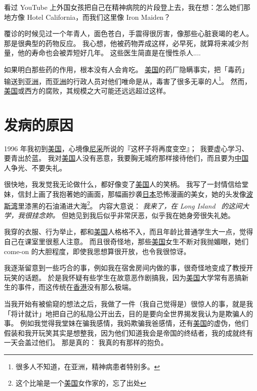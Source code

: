\documentclass[12pt]{report}
\newcommand{\speechCn}[1]{\textrm{\textit{\textcolor{Speech}{#1}}}}
\begin{document}
{看过 YouTube 上外国女孩把自己在精神病院的片段登上去，我在想：怎么她们那地方像 Hotel California，而我们这里像 Iron Maiden？

覆诊的时候见过一个年青人，面色苍白，手震得很厉害，像那些心脏衰竭的老人。 那是很典型的药物反应。 我心想，他被药物弄成这样，必早死，就算将来减少剂量，他的寿命也会被弄短好几年。 这些医生简直是在慢性杀人....

如果明白那些药的作用，根本没有人会肯吃。 \uline{美国}的药厂隐瞒事实，把「毒药」输送到\uline{亚洲}，而\uline{亚洲}的行政人员对他们唯命是从，毒害了很多无辜的人\footnote{很多人不知道，在亚洲，精神病患者特别多。}。 然而，\uline{美国}或西方的腐败，其规模之大可能还远远超过这样。


\chapter{发病的原因}
\label{cause-of-illness}

1996 年我初到\uline{美国}，心境像\uline{尼采}所说的『这杯子将再度变空』；\ 我要虚心学习、要青出於蓝。 我对\uline{美国}人没有恶意，我要胸无城府那样接待他们，而且要为\uline{中国}人争光、不要失礼。

很快地，我发觉我无论做什么，都好像变了\uline{美国}人的笑柄。 我写了一封情信给堂妹，信封上画了我抱著她的画面，那幅画抄袭\uline{日本}恐怖漫画的美女，她的头发像\uline{波斯湾}里漆黑的石油涌进大海\footnote{这个比喻是一个\uline{美国}女作家的，忘了出处}。 内容大意说： \speechCn{我来了，在 Long Island \ 的这间大学，我很挂念妳。}  但她见到我后似乎非常厌恶，似乎我在她身旁很失礼她。

我穿的衣服、行为举止，都和\uline{美国}人格格不入，而且年龄比普通学生大一点，觉得自己在课室里很惹人注意。 而且很奇怪地，那些\uline{美国}女生不断对我抛媚眼，她们 come-on 的大胆程度，即使我思想算很开放，也令我很惊讶。

我逐渐留意到一些巧合的事，例如我在宿舍房间内做的事，很奇怪地变成了教授开玩笑的话题。 於是我怀疑有些学生在故意恶作剧搞我，因为\uline{美国}大学常有恶搞新生的事件，而这传统在\uline{香港}没有那么极端。

当我开始有被偷窥的想法之后，我做了一件（我自己觉得是）很惊人的事，就是我「将计就计」地把自己的私隐公开出去，目的是要向全世界揭发我认为是欺骗人的事。  例如我觉得我堂妹在骗我感情，我妈欺骗我爸感情，还有\uline{美国}的虚伪，他们假装和我开玩笑其实是想整我，因为他们知道我会是帝国的终结者，我的成就终有一天会盖过他们。 那是真的： 我真的有那样的抱负。

}
\end{document}
